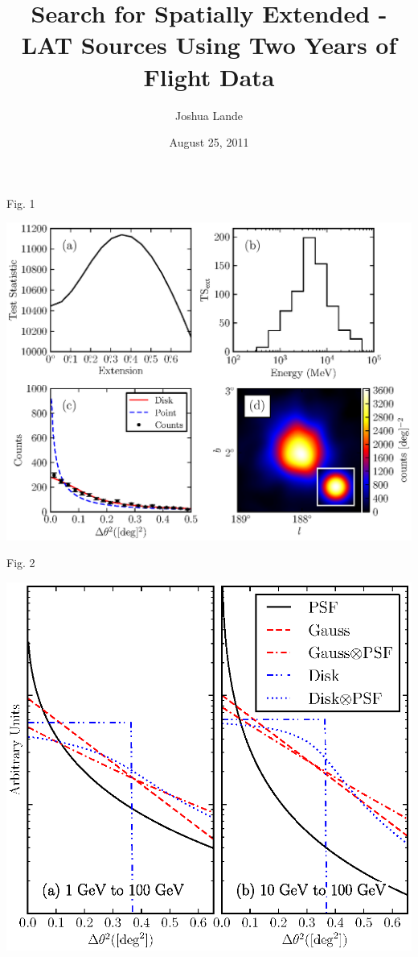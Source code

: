 \documentclass[12pt]{beamer}
\title{Search for Spatially Extended \fermi-LAT Sources Using Two Years of Flight
Data}
\author{Joshua Lande}
\institute{SLAC/Stanford}
\date{August 25, 2011}
\begin{document}


\begin{frame}{Fig. 1}
  \begin{center}
    \includegraphics[scale=0.5]{../paper/ic443_plots/four_plots_ic443_color.eps}
  \end{center}
\end{frame}

\begin{frame}{Fig. 2}
  \begin{center}
    \includegraphics[scale=0.5]{../paper/mc_plots/compare_disk_gauss_color.eps}
  \end{center}
\end{frame}
\end{document}
